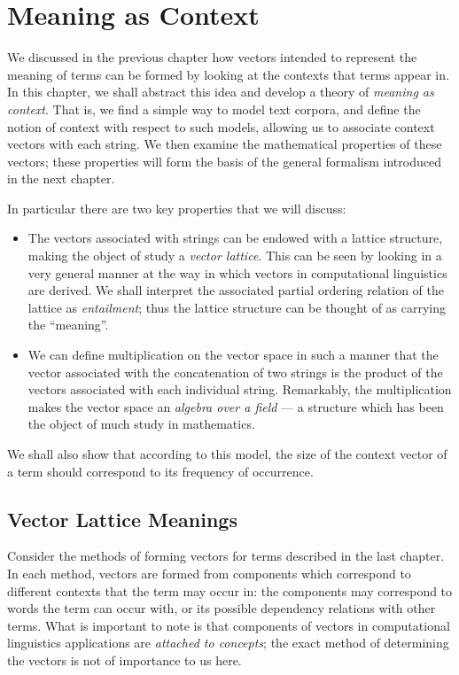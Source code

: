 \documentclass[11pt]{report}
\begin{document}
\chapter{Meaning as Context}

We discussed in the previous chapter how vectors intended to represent the meaning of terms can be formed by looking at the contexts that terms appear in. In this chapter, we shall abstract this idea and develop a theory of \emph{meaning as context}. That is, we find a simple way to model text corpora, and define the notion of context with respect to such models, allowing us to associate context vectors with each string. We then examine the mathematical properties of these vectors; these properties will form the basis of the general formalism introduced in the next chapter.

In particular there are two key properties that we will discuss:
\begin{itemize}
\item The vectors associated with strings can be endowed with a lattice structure, making the object of study a \emph{vector lattice}. This can be seen by looking in a very general manner at the way in which vectors in computational linguistics are derived. We shall interpret the associated partial ordering relation of the lattice as \emph{entailment}; thus the lattice structure can be thought of as carrying the ``meaning''.
\item We can define multiplication on the vector space in such a manner that the vector associated with the concatenation of two strings is the product of the vectors associated with each individual string. Remarkably, the multiplication makes the vector space an \emph{algebra over a field} --- a structure which has been the object of much study in mathematics.
\end{itemize}
We shall also show that according to this model, the size of the context vector of a term should correspond to its frequency of occurrence.

\section{Vector Lattice Meanings}

Consider the methods of forming vectors for terms described in the last chapter. In each method, vectors are formed from components which correspond to different contexts that the term may occur in: the components may correspond to words the term can occur with, or its possible dependency relations with other terms. What is important to note is that components of vectors in computational linguistics applications are \emph{attached to concepts}; the exact method of determining the vectors is not of importance to us here.
\end{document}
